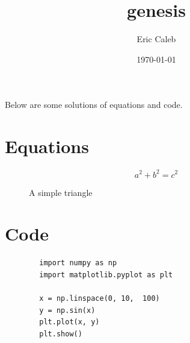 \documentclass{article}
\title{genesis}
\author{Eric Caleb}
\date{\today}
\begin{document}
  \maketitle
  Below are some solutions of equations and code.

  \section{Equations}

    \begin{equation}
        a^2 + b^2 = c^2
    \end{equation}

    \begin{figure}[H]
        \centering
            \caption{A simple triangle}
    \end{figure}


  \section{Code}

    \begin{lstlisting}
        import numpy as np
        import matplotlib.pyplot as plt

        x = np.linspace(0, 10,  100)
        y = np.sin(x)
        plt.plot(x, y)
        plt.show()

    \end{lstlisting}
  
\end{document}
